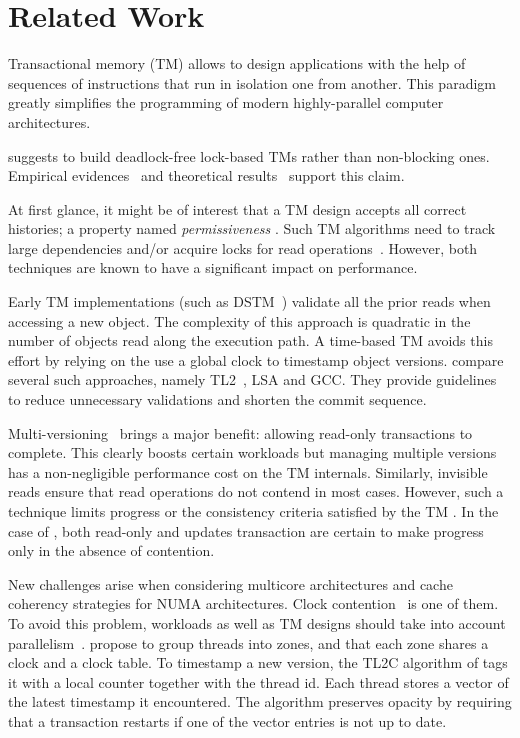 \section{Related Work}

Transactional memory (TM) allows to design applications with the help of sequences of instructions that run in isolation one from another.
This paradigm greatly simplifies the programming of modern highly-parallel computer architectures.

\citet{emals} suggests to build deadlock-free lock-based TMs rather than non-blocking ones.
Empirical evidences~\cite{dice06} and theoretical results~\cite{Guerraoui:2008,KuznetsovR15} support this claim.

At first glance, it might be of interest that a TM design accepts all correct histories; a property named \emph{permissiveness} \cite{guerraoui08}.
Such TM algorithms need to track large dependencies \cite{Keidar:2009} and/or acquire locks for read operations~\cite{attiya2012single}.
However, both techniques are known to have a significant impact on performance.

Early TM implementations (such as DSTM~\cite{herlihy2003software}) validate all the prior reads when accessing a new object.
The complexity of this approach is quadratic in the number of objects read along the execution path.
A time-based TM avoids this effort by relying on the use a global clock to timestamp object versions.
\citet{zhang2008commit} compare several such approaches, namely TL2~\cite{dice2006transactional}, LSA \cite{riegel2006lazy} and GCC\cite{spear2006conflict}.
They provide guidelines to reduce unnecessary validations and shorten the commit sequence.

Multi-versioning~\cite{Fernandes:2011, Diegues:2014} brings a major benefit: allowing read-only transactions to complete.
This clearly boosts certain workloads but managing multiple versions has a non-negligible performance cost on the TM internals.
Similarly, invisible reads ensure that read operations do not contend in most cases.
However, such a technique limits progress or the consistency criteria satisfied by the TM \cite{Attiya:2009}.
In the case of , both read-only and updates transaction are certain to make progress only in the absence of contention.

New challenges arise when considering multicore architectures and cache coherency strategies for NUMA architectures.
Clock contention~\cite{6121290} is one of them.
To avoid this problem, workloads as well as TM designs should take into account parallelism~\cite{Nguyen:2017}.
\citet{6121290} propose to group threads into zones, and that each zone shares a clock and a clock table.
To timestamp a new version, the TL2C algorithm of \citet{Avni:2008} tags it with a local counter together with the thread id.
Each thread stores a vector of the latest timestamp it encountered.
The algorithm preserves opacity by requiring that a transaction restarts if one of the vector entries is not up to date.

